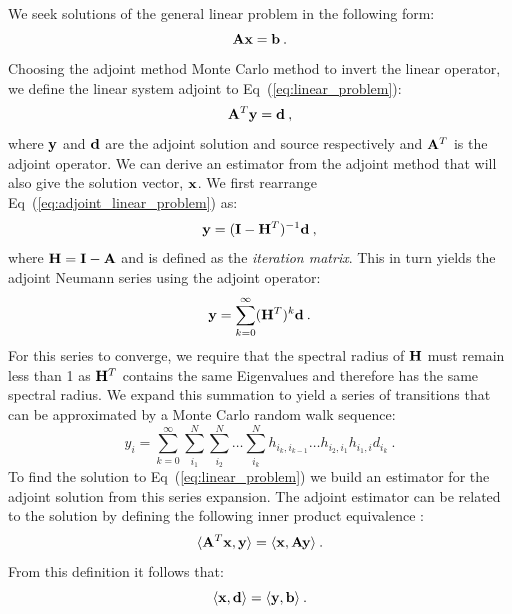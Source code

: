 \documentclass{mc2013}
\begin{document}
We seek solutions of the general linear problem in the following form:
\begin{equation}
  \mathbf{A} \mathbf{x} = \mathbf{b}\:.
  \label{eq:linear_problem}
\end{equation}
Choosing the adjoint method Monte Carlo method to invert the linear
operator, we define the linear system adjoint to
Eq~(\ref{eq:linear_problem}):
\begin{equation}
  \mathbf{A}^T \mathbf{y} = \mathbf{d}\:,
  \label{eq:adjoint_linear_problem}
\end{equation}
where $\mathbf{y}$ and $\mathbf{d}$ are the adjoint solution and source
respectively and $\mathbf{A}^T$ is the adjoint operator. We can derive an
estimator from the adjoint method that will also give the solution
vector, $\mathbf{x}$. We first rearrange
Eq~(\ref{eq:adjoint_linear_problem}) as:
\begin{equation}
  \mathbf{y} = (\mathbf{I} - \mathbf{H}^T)^{-1} \mathbf{d}\:,
  \label{eq:adjoint_split_system_2}
\end{equation}
where $\mathbf{H} = \mathbf{I} - \mathbf{A}$ and is defined as the
\textit{iteration matrix}.  This in turn yields the adjoint Neumann series
using the adjoint operator:
\begin{equation}
  \mathbf{y} = \sum_{k=0}^{\infty} (\mathbf{H}^T)^k\mathbf{d}\:.
  \label{eq:adjoint_neumann_series}
\end{equation}
For this series to converge, we require that the spectral radius of
$\mathbf{H}$ must remain less than 1 as $\mathbf{H}^T$ contains the same
Eigenvalues and therefore has the same spectral radius. We expand this
summation to yield a series of transitions that can be approximated by
a Monte Carlo random walk sequence:
\begin{equation}
  y_i = \sum_{k=0}^{\infty}\sum_{i_1}^{N}\sum_{i_2}^{N}\ldots
  \sum_{i_k}^{N}h_{i_k,i_{k-1}}\ldots h_{i_2,i_1} h_{i_1,i} d_{i_k}\:.
  \label{eq:adjoint_neumann_solution}
\end{equation}
To find the solution to Eq~(\ref{eq:linear_problem}) we build an
estimator for the adjoint solution from this series expansion. The
adjoint estimator can be related to the solution by defining the
following inner product equivalence \cite{spanier_monte_1969}:
\begin{equation}
  \langle \mathbf{A}^T \mathbf{x}, \mathbf{y} \rangle = \langle \mathbf{x}, \mathbf{A}
  \mathbf{y} \rangle\:.
  \label{eq:adjoint_operator_product}
\end{equation}
From this definition it follows that:
\begin{equation}
  \langle \mathbf{x}, \mathbf{d} \rangle = \langle \mathbf{y}, \mathbf{b} \rangle\:.
  \label{eq:adjoint_vector_relation}
\end{equation}
\end{document}
